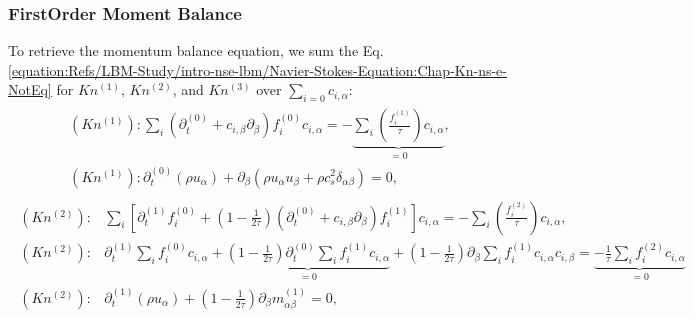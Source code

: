 \documentclass[letterpaper,10pt,english,openany,oneside]{jupyterBook}
\begin{document}
\subsubsection{First\sphinxhyphen{}Order Moment Balance}
\label{\detokenize{Refs/LBM-Study/intro-nse-lbm/Navier-Stokes-Equation:first-order-moment-balance}}
\sphinxAtStartPar
To retrieve the momentum balance equation, we sum the Eq. \eqref{equation:Refs/LBM-Study/intro-nse-lbm/Navier-Stokes-Equation:Chap-Kn-ns-e-NotEq} for \(Kn^{(1)}\), \(Kn^{(2)}\), and \(Kn^{(3)}\) over \(\sum_{i=0}c_{i,\alpha} \):
\begin{equation}\label{equation:Refs/LBM-Study/intro-nse-lbm/Navier-Stokes-Equation:ns-e-Kn1-B1-all}
\begin{split}
\begin{array}{l}
(Kn^{(1)}): \displaystyle\sum_{i}\left( \partial_{t}^{(0)} + c_{i,\beta}\partial_{\beta} \right)f_{i}^{(0)}c_{i,\alpha}= - \underbrace{\displaystyle\sum_{i}\left(\displaystyle\frac{ f_{i}^{(1)} }{ \tau } \right)c_{i,\alpha} }_{=0},\\
(Kn^{(1)}): \partial_{t}^{(0)} \left( \rho u_{\alpha} \right) + \partial_{\beta} \left(\rho u_{\alpha}u_{\beta} + \rho c_{s}^{2}\delta_{\alpha\beta} \right) =0,
\end{array}
\end{split}
\end{equation}\begin{equation}\label{equation:Refs/LBM-Study/intro-nse-lbm/Navier-Stokes-Equation:ns-e-Kn2-B1-all}
\begin{split}
\begin{array}{ll}
(Kn^{(2)}):& \displaystyle\sum_{i}\left[ \partial_{t}^{(1)} f_{i}^{(0)} + \displaystyle\left(1 - \frac{1}{2\tau}\right)\left( \partial_{t}^{(0)} + c_{i,\beta}\partial_{\beta} \right) f_{i}^{(1)} \right]c_{i,\alpha} =  - \displaystyle\sum_{i}\left(\displaystyle\frac{ f_{i}^{(2)} }{ \tau } \right)c_{i,\alpha}, \nonumber \\
(Kn^{(2)}):& \partial_t^{(1)} \displaystyle\sum_i f_i^{(0)}c_{i,\alpha}  + \underbrace{\left(1-\frac{1}{2\tau}\right) \partial_t^{(0)} \sum_i f_i^{(1)}c_{i,\alpha} }_{=0} + \left(1-\frac{1}{2\tau}\right) \partial_\beta \sum_i f_i^{(1)}c_{i,\alpha}c_{i,\beta}  =\underbrace{-\frac{1}{\tau} \sum_i f_i^{(2)}c_{i,\alpha} }_{=0} \\
(Kn^{(2)}):& \partial_{t}^{(1)} \left(\rho u_{\alpha}\right) + \left(1-\displaystyle\frac{1}{2\tau}\right) \partial_\beta m^{(1)}_{\alpha\beta}  = 0,
\end{array}
\end{split}
\end{equation}
\end{document}
